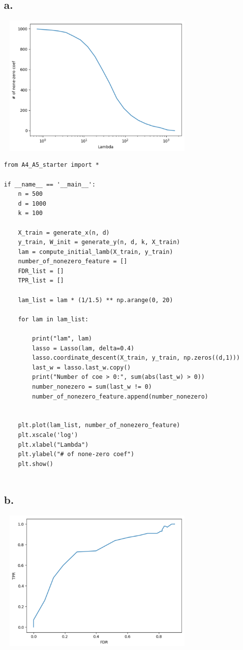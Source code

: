 \documentclass{article}
\begin{document}
\subsection*{a.}

\includegraphics[width=10cm, height=7cm]{A4_a.png}


\begin{verbatim}
from A4_A5_starter import *

if __name__ == '__main__':
	n = 500
	d = 1000
	k = 100
	
	X_train = generate_x(n, d)
	y_train, W_init = generate_y(n, d, k, X_train)
	lam = compute_initial_lamb(X_train, y_train)
	number_of_nonezero_feature = []
	FDR_list = []
	TPR_list = []
	
	lam_list = lam * (1/1.5) ** np.arange(0, 20)
	
	for lam in lam_list:
		
		print("lam", lam)
		lasso = Lasso(lam, delta=0.4)
		lasso.coordinate_descent(X_train, y_train, np.zeros((d,1)))
		last_w = lasso.last_w.copy()
		print("Number of coe > 0:", sum(abs(last_w) > 0))
		number_nonezero = sum(last_w != 0)
		number_of_nonezero_feature.append(number_nonezero)
		
		
	plt.plot(lam_list, number_of_nonezero_feature)
	plt.xscale('log')
	plt.xlabel("Lambda")
	plt.ylabel("# of none-zero coef")
	plt.show()


\end{verbatim}




\subsection*{b.}


\includegraphics[width=10cm, height=7cm]{A4_b.png}
\end{document}
